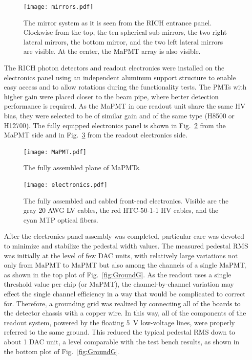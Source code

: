 \documentclass[5p,times,twocolumn]{elsarticle}
\def\MaPMT{MaPMT }
\begin{document}
\begin{figure}
\begin{center}
\texttt{[image: mirrors.pdf]}
\caption{The mirror system as it is seen from the RICH entrance panel. Clockwise from the top, the ten spherical
  sub-mirrors, the two right lateral mirrors, the bottom mirror, and the two left lateral mirrors are visible. At the
  center, the MaPMT array is also visible.}
\label{fig:mirrors}
\end{center}
\end{figure}

The RICH photon detectors and readout electronics were installed on the electronics panel using an independent
aluminum support structure to enable easy access and to allow rotations during the functionality tests. The PMTs
with higher gain were placed closer to the beam pipe, where better detection performance is required. As the \MaPMT in
one readout unit share the same HV bias, they were selected to be of similar gain and of the same type (H8500 or H12700).
The fully equipped electronics panel is shown in Fig.~\ref{fig:MaPMTs} from the MaPMT side and in
Fig.~\ref{fig:electronics} from the readout electronics side.

\begin{figure}
\begin{center}
\texttt{[image: MaPMT.pdf]}
\caption{The fully assembled plane of MaPMTs.}
\label{fig:MaPMTs}
\end{center}
\end{figure}

\begin{figure}
\begin{center}
\texttt{[image: electronics.pdf]}
\caption{The fully assembled and cabled front-end electronics. Visible are the gray 20 AWG LV cables, the red
  HTC-50-1-1 HV cables, and the cyan MTP optical fibers.}
\label{fig:electronics}
\end{center}
\end{figure}

After the electronics panel assembly was completed, particular care was devoted to minimize and stabilize the
pedestal width values. The measured pedestal RMS was initially at the level of few DAC units, with relatively large
variations not only from MaPMT to MaPMT but also among the channels of a single MaPMT, as shown in the top
plot of Fig.~\ref{fig:GroundG}. As the readout uses a single threshold value per chip (or MaPMT), the channel-by-channel
variation may effect the single channel efficiency in a way that  would be complicated to correct for.
Therefore, a grounding grid was realized by connecting all of the boards to the detector chassis with a copper wire.
In this way, all of the components of the readout system, powered by the floating 5~V low-voltage lines, were properly
referred to the same ground. This reduced the typical pedestal RMS down to about 1 DAC unit, a level comparable
with the test bench results, as shown in the bottom plot of Fig.~\ref{fig:GroundG}.
\end{document}
